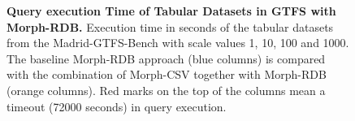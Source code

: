 \begin{figure}[th]
{  \label{fig:morphgtfs1000}
  }
\caption[Query execution Time in GTFS with Morph-RDB]{\textbf{Query execution Time of Tabular Datasets in GTFS with Morph-RDB.} Execution time in seconds of the tabular datasets from the Madrid-GTFS-Bench with scale values 1, 10, 100 and 1000. The baseline Morph-RDB approach (blue columns) is compared with the combination of Morph-CSV together with Morph-RDB (orange columns). Red marks on the top of the columns mean a timeout (72000 seconds) in  query execution.}
\label{fig:morphgtfs}
\end{figure}

\begin{figure}[th]

  \centering
  \qquad
\end{figure}
